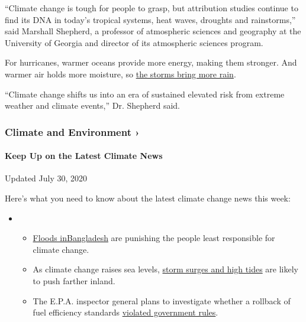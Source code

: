 ``Climate change is tough for people to grasp, but attribution studies
continue to find its DNA in today's tropical systems, heat waves,
droughts and rainstorms,'' said Marshall Shepherd, a professor of
atmospheric sciences and geography at the University of Georgia and
director of its atmospheric sciences program.

For hurricanes, warmer oceans provide more energy, making them stronger.
And warmer air holds more moisture, so
\href{https://www.nytimes3xbfgragh.onion/2019/07/11/climate/hurricane-tropical-storms.html}{the
storms bring more rain}.

``Climate change shifts us into an era of sustained elevated risk from
extreme weather and climate events,'' Dr. Shepherd said.

\href{https://www.nytimes3xbfgragh.onion/section/climate?action=click\&pgtype=Article\&state=default\&region=MAIN_CONTENT_1\&context=storylines_keepup}{}

\hypertarget{climate-and-environment-}{%
\subsubsection{Climate and Environment
›}\label{climate-and-environment-}}

\hypertarget{keep-up-on-the-latest-climate-news}{%
\paragraph{Keep Up on the Latest Climate
News}\label{keep-up-on-the-latest-climate-news}}

Updated July 30, 2020

Here's what you need to know about the latest climate change news this
week:

\begin{itemize}
\item
  \begin{itemize}
  \tightlist
  \item
    \href{https://www.nytimes3xbfgragh.onion/2020/07/30/climate/bangladesh-floods.html?action=click\&pgtype=Article\&state=default\&region=MAIN_CONTENT_1\&context=storylines_keepup}{Floods
    in}\href{https://www.nytimes3xbfgragh.onion/2020/07/30/climate/bangladesh-floods.html?action=click\&pgtype=Article\&state=default\&region=MAIN_CONTENT_1\&context=storylines_keepup}{Bangladesh}
    are punishing the people least responsible for climate change.
  \item
    As climate change raises sea levels,
    \href{https://www.nytimes3xbfgragh.onion/2020/07/30/climate/sea-level-inland-floods.html?action=click\&pgtype=Article\&state=default\&region=MAIN_CONTENT_1\&context=storylines_keepup}{storm
    surges and high tides} are likely to push farther inland.
  \item
    The E.P.A. inspector general plans to investigate whether a rollback
    of fuel efficiency standards
    \href{https://www.nytimes3xbfgragh.onion/2020/07/27/climate/trump-fuel-efficiency-rule.html?action=click\&pgtype=Article\&state=default\&region=MAIN_CONTENT_1\&context=storylines_keepup}{violated
    government rules}.
  \end{itemize}
\end{itemize}

